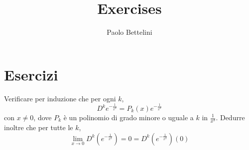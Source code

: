 \documentclass[a4paper]{article}
\title{Exercises}
\author{Paolo Bettelini}
\date{}
\begin{document}
\maketitle
\tableofcontents

\section{Esercizi}

\begin{snippetexercise}{}
    Verificare per induzione che
    per ogni \(k\),
    \[
        D^k e^{-\frac{1}{x^2}} = P_k(x) e^{-\frac{1}{x^2}}
    \]
    con \(x\neq 0\), dove \(P_k\) è un polinomio di grado minore o uguale a \(k\)
    in \(\frac{1}{x^3}\).
    Dedurre inoltre che per tutte le \(k\),
    \[
        \lim_{x\to 0} D^k \left(e^{-\frac{1}{x^2}}\right) = 0
        = D^k\left(e^{-\frac{1}{x^2}}\right)(0)
    \]
\end{snippetexercise}
\end{document}
